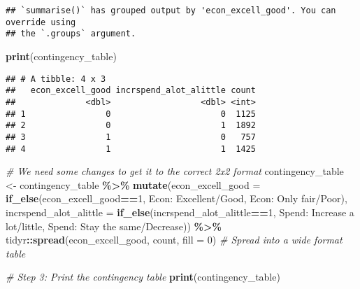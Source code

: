 \documentclass[
  11pt,
]{article}
\newenvironment{Shaded}{\begin{snugshade}}{\end{snugshade}}
\newcommand{\AttributeTok}[1]{\textcolor[rgb]{0.13,0.29,0.53}{#1}}
\newcommand{\CommentTok}[1]{\textcolor[rgb]{0.56,0.35,0.01}{\textit{#1}}}
\newcommand{\DecValTok}[1]{\textcolor[rgb]{0.00,0.00,0.81}{#1}}
\newcommand{\FunctionTok}[1]{\textcolor[rgb]{0.13,0.29,0.53}{\textbf{#1}}}
\newcommand{\NormalTok}[1]{#1}
\newcommand{\OtherTok}[1]{\textcolor[rgb]{0.56,0.35,0.01}{#1}}
\newcommand{\SpecialCharTok}[1]{\textcolor[rgb]{0.81,0.36,0.00}{\textbf{#1}}}
\newcommand{\StringTok}[1]{\textcolor[rgb]{0.31,0.60,0.02}{#1}}
\begin{document}
\begin{verbatim}
## `summarise()` has grouped output by 'econ_excell_good'. You can override using
## the `.groups` argument.
\end{verbatim}

\begin{Shaded}
\begin{Highlighting}[]
\FunctionTok{print}\NormalTok{(contingency\_table)}
\end{Highlighting}
\end{Shaded}

\begin{verbatim}
## # A tibble: 4 x 3
##   econ_excell_good incrspend_alot_alittle count
##              <dbl>                  <dbl> <int>
## 1                0                      0  1125
## 2                0                      1  1892
## 3                1                      0   757
## 4                1                      1  1425
\end{verbatim}

\begin{Shaded}
\begin{Highlighting}[]
\CommentTok{\# We need some changes to get it to the correct 2x2 format}
\NormalTok{contingency\_table }\OtherTok{\textless{}{-}}\NormalTok{ contingency\_table }\SpecialCharTok{\%\textgreater{}\%}
  \FunctionTok{mutate}\NormalTok{(}\AttributeTok{econ\_excell\_good =} \FunctionTok{if\_else}\NormalTok{(econ\_excell\_good}\SpecialCharTok{==}\DecValTok{1}\NormalTok{, }
                                    \StringTok{\textquotesingle{}Econ: Excellent/Good\textquotesingle{}}\NormalTok{, }\StringTok{\textquotesingle{}Econ: Only fair/Poor\textquotesingle{}}\NormalTok{),}
         \AttributeTok{incrspend\_alot\_alittle =} \FunctionTok{if\_else}\NormalTok{(incrspend\_alot\_alittle}\SpecialCharTok{==}\DecValTok{1}\NormalTok{, }
                                          \StringTok{\textquotesingle{}Spend: Increase a lot/little\textquotesingle{}}\NormalTok{, }\StringTok{\textquotesingle{}Spend: Stay the same/Decrease\textquotesingle{}}\NormalTok{)) }\SpecialCharTok{\%\textgreater{}\%}
\NormalTok{  tidyr}\SpecialCharTok{::}\FunctionTok{spread}\NormalTok{(econ\_excell\_good, count, }\AttributeTok{fill =} \DecValTok{0}\NormalTok{)  }\CommentTok{\# Spread into a wide format table}

\CommentTok{\# Step 3: Print the contingency table}
\FunctionTok{print}\NormalTok{(contingency\_table)}
\end{Highlighting}
\end{Shaded}
\end{document}
